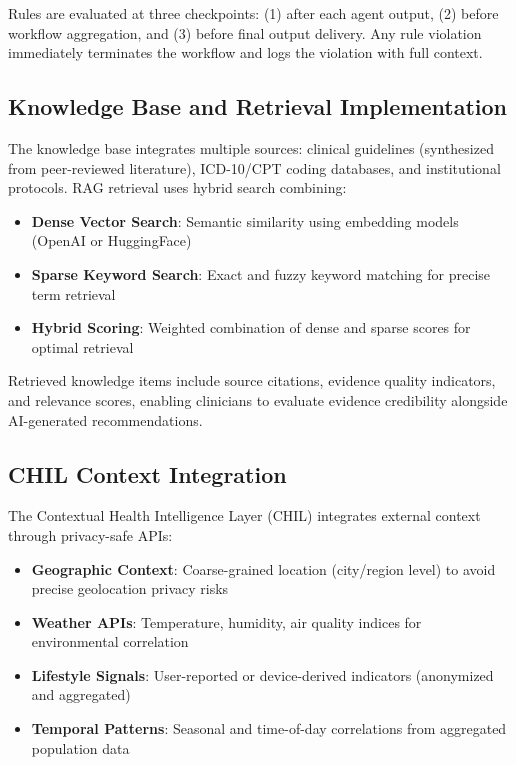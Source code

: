 \documentclass[journal]{IEEEtran}
\begin{document}
Rules are evaluated at three checkpoints: (1) after each agent output, (2) before workflow aggregation, and (3) before final output delivery. Any rule violation immediately terminates the workflow and logs the violation with full context.

\subsection{Knowledge Base and Retrieval Implementation}
The knowledge base integrates multiple sources: clinical guidelines (synthesized from peer-reviewed literature), ICD-10/CPT coding databases, and institutional protocols. RAG retrieval uses hybrid search combining:

\begin{itemize}
    \item \textbf{Dense Vector Search}: Semantic similarity using embedding models (OpenAI or HuggingFace)
    \item \textbf{Sparse Keyword Search}: Exact and fuzzy keyword matching for precise term retrieval
    \item \textbf{Hybrid Scoring}: Weighted combination of dense and sparse scores for optimal retrieval
\end{itemize}

Retrieved knowledge items include source citations, evidence quality indicators, and relevance scores, enabling clinicians to evaluate evidence credibility alongside AI-generated recommendations.

\subsection{CHIL Context Integration}
The Contextual Health Intelligence Layer (CHIL) integrates external context through privacy-safe APIs:

\begin{itemize}
    \item \textbf{Geographic Context}: Coarse-grained location (city/region level) to avoid precise geolocation privacy risks
    \item \textbf{Weather APIs}: Temperature, humidity, air quality indices for environmental correlation
    \item \textbf{Lifestyle Signals}: User-reported or device-derived indicators (anonymized and aggregated)
    \item \textbf{Temporal Patterns}: Seasonal and time-of-day correlations from aggregated population data
\end{itemize}
\end{document}

